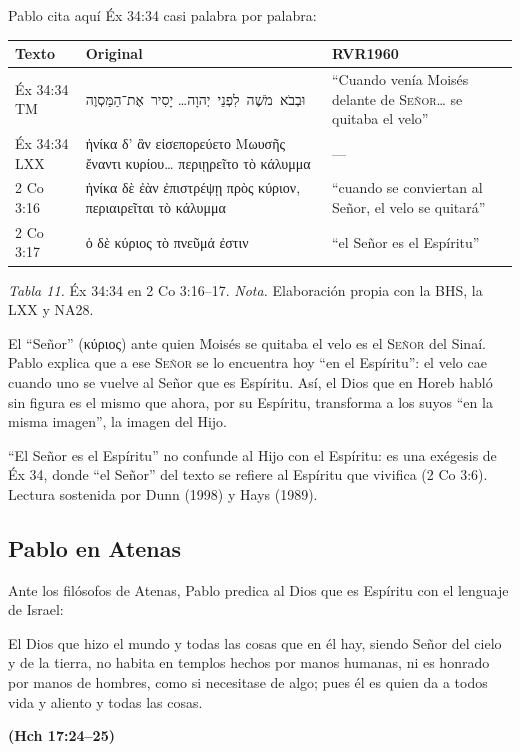 \documentclass[11pt,letterpaper]{article}
\newcommand{\heb}[1]{\mbox{\foreignlanguage{hebrew}{#1}}}
\newcommand{\grc}[1]{\foreignlanguage{ancientgreek}{#1}}
\newcommand{\SENOR}{\textsc{Señor}}
\newcommand{\fuente}[1]{\par\hfill{\upshape\bfseries\small\textcolor{azul}{#1}}}
\begin{document}
Pablo cita aquí Éx 34:34 casi palabra por palabra:

\begin{center}\small\renewcommand{\arraystretch}{1.22}
\begin{tabular}{@{}L{2.0cm}L{7.0cm}L{5.2cm}@{}}
\toprule
\textbf{Texto} & \textbf{Original} & \textbf{RVR1960} \\ \midrule
Éx 34:34 TM & \heb{וּבְבֹא מֹשֶׁה לִפְנֵי יְהוָה}\ldots{} \heb{יָסִיר אֶת־הַמַּסְוֶה} & ``Cuando venía Moisés delante de \SENOR\ldots{} se quitaba el velo'' \\
Éx 34:34 LXX & \grc{ἡνίκα δ’ ἂν εἰσεπορεύετο Μωυσῆς ἔναντι κυρίου\ldots{} περιῃρεῖτο τὸ κάλυμμα} & --- \\
2 Co 3:16 & \grc{ἡνίκα δὲ ἐὰν ἐπιστρέψῃ πρὸς κύριον, περιαιρεῖται τὸ κάλυμμα} & ``cuando se conviertan al Señor, el velo se quitará'' \\
2 Co 3:17 & \grc{ὁ δὲ κύριος τὸ πνεῦμά ἐστιν} & ``el Señor es el Espíritu'' \\
\bottomrule
\end{tabular}\par
{\footnotesize\color{gris}\textit{Tabla 11.} Éx 34:34 en 2 Co 3:16--17. \textit{Nota.} Elaboración propia con la BHS, la LXX y NA28.}
\end{center}

El ``Señor'' (\grc{κύριος}) ante quien Moisés se quitaba el velo es el \SENOR{} del Sinaí. Pablo explica que a ese \SENOR{} se lo encuentra hoy ``en el Espíritu'': el velo cae cuando uno se vuelve al Señor que es Espíritu. Así, el Dios que en Horeb habló sin figura es el mismo que ahora, por su Espíritu, transforma a los suyos ``en la misma imagen'', la imagen del Hijo.

\begin{nota}[Precisión]
``El Señor es el Espíritu'' no confunde al Hijo con el Espíritu: es una exégesis de Éx 34, donde ``el Señor'' del texto se refiere al Espíritu que vivifica (2 Co 3:6). Lectura sostenida por Dunn (1998) y Hays (1989).
\end{nota}

\subsection{Pablo en Atenas}

Ante los filósofos de Atenas, Pablo predica al Dios que es Espíritu con el lenguaje de Israel:

\begin{cita}El Dios que hizo el mundo y todas las cosas que en él hay, siendo Señor del cielo y de la tierra, no habita en templos hechos por manos humanas, ni es honrado por manos de hombres, como si necesitase de algo; pues él es quien da a todos vida y aliento y todas las cosas.\fuente{(Hch 17:24--25)}\end{cita}
\end{document}
